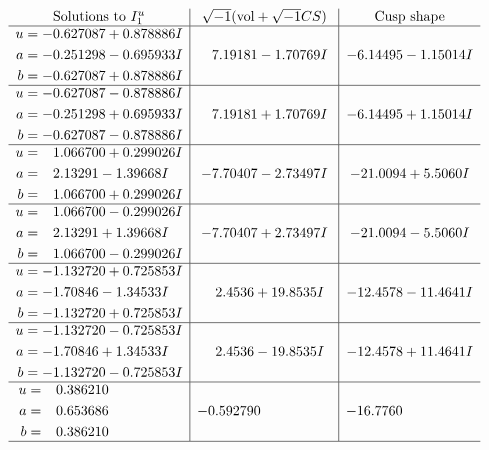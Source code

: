 \documentclass[1p]{elsarticle_modified}
\theoremstyle{definition}
\newcommand{\I}{\sqrt{-1}}
\begin{document}
$$\begin{array}{c|c|c}  
\text{Solutions to }I^u_{1}& \I (\text{vol} + \sqrt{-1}CS) & \text{Cusp shape}\\
 \hline 
\begin{aligned}
u &= -0.627087 + 0.878886 I \\
a &= -0.251298 - 0.695933 I \\
b &= -0.627087 + 0.878886 I\end{aligned}
 & \phantom{-}7.19181 - 1.70769 I & -6.14495 - 1.15014 I \\ \hline\begin{aligned}
u &= -0.627087 - 0.878886 I \\
a &= -0.251298 + 0.695933 I \\
b &= -0.627087 - 0.878886 I\end{aligned}
 & \phantom{-}7.19181 + 1.70769 I & -6.14495 + 1.15014 I \\ \hline\begin{aligned}
u &= \phantom{-}1.066700 + 0.299026 I \\
a &= \phantom{-}2.13291 - 1.39668 I \\
b &= \phantom{-}1.066700 + 0.299026 I\end{aligned}
 & -7.70407 - 2.73497 I & -21.0094 + 5.5060 I \\ \hline\begin{aligned}
u &= \phantom{-}1.066700 - 0.299026 I \\
a &= \phantom{-}2.13291 + 1.39668 I \\
b &= \phantom{-}1.066700 - 0.299026 I\end{aligned}
 & -7.70407 + 2.73497 I & -21.0094 - 5.5060 I \\ \hline\begin{aligned}
u &= -1.132720 + 0.725853 I \\
a &= -1.70846 - 1.34533 I \\
b &= -1.132720 + 0.725853 I\end{aligned}
 & \phantom{-}2.4536 + 19.8535 I & -12.4578 - 11.4641 I \\ \hline\begin{aligned}
u &= -1.132720 - 0.725853 I \\
a &= -1.70846 + 1.34533 I \\
b &= -1.132720 - 0.725853 I\end{aligned}
 & \phantom{-}2.4536 - 19.8535 I & -12.4578 + 11.4641 I \\ \hline\begin{aligned}
u &= \phantom{-}0.386210\phantom{ +0.000000I} \\
a &= \phantom{-}0.653686\phantom{ +0.000000I} \\
b &= \phantom{-}0.386210\phantom{ +0.000000I}\end{aligned}
 & -0.592790\phantom{ +0.000000I} & -16.7760\phantom{ +0.000000I}\\
 \hline 
 \end{array}$$\newpage\newpage\renewcommand{\arraystretch}{1}
\end{document}
